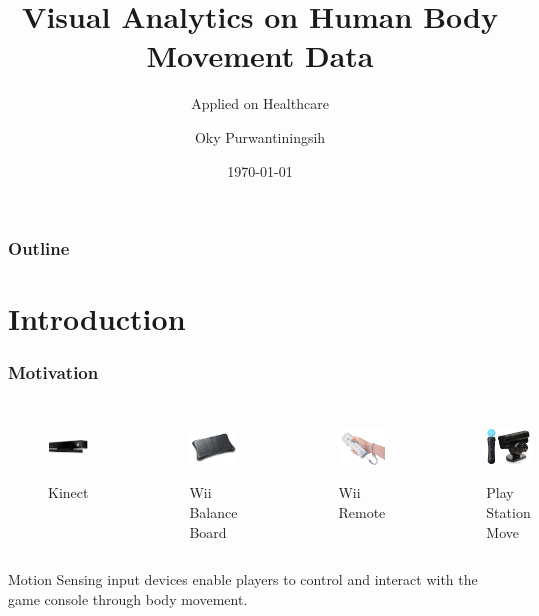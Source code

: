 \documentclass{beamer}
\title[VA on Human Body Movement Data]{Visual Analytics on Human Body Movement Data }
\subtitle{Applied on Healthcare}
\author{Oky Purwantiningsih}
\institute{IT4BI Master Thesis}
\date{\today}
\begin{document}
\begin{frame}
\titlepage
\end{frame}

\begin{frame}
\label{contents}
\frametitle{Outline}
\tableofcontents
\end{frame}

\section{Introduction}
\begin{frame}
\frametitle{Motivation}
\begin{columns}
\centering
\begin{figure}
\includegraphics[width=3.5cm,height=1.7cm]{images/kinect.jpg}
\caption{Kinect}
\end{figure}
\begin{figure}
\includegraphics[width=3.5cm,height=1.7cm]{images/wii_balance_board.jpg}
\caption{Wii Balance Board}
\end{figure}

\centering
\begin{figure}
\includegraphics[width=3.5cm,height=1.7cm]{images/wii_remote.jpg}
\caption{Wii Remote}
\end{figure}
\begin{figure}
\includegraphics[width=3.5cm,height=1.7cm]{images/play_station_move.jpg}
\caption{Play Station Move}
\end{figure}

\end{columns}
Motion Sensing input devices enable players to control and interact with the game console through body movement.
\end{frame}
\end{document}
